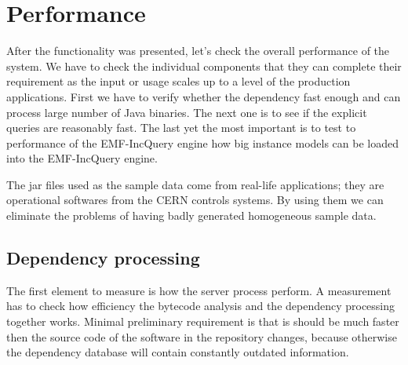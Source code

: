 \section{Performance}
After the functionality was presented, let's check the overall performance of
the system. We have to check the individual components  that they can complete
their requirement as the input or usage scales up to a level of the production
applications. First we have to verify whether the dependency fast enough and can
process large number of Java binaries. The next one is to see if the explicit
queries are reasonably fast. The last yet the most important is to test to
performance of the EMF-IncQuery engine how big instance models can be loaded
into the EMF-IncQuery engine.

The jar files used as the sample data come from real-life applications; they are
operational softwares from the CERN controls systems. By using them we can
eliminate the problems of having badly generated homogeneous sample data.

\subsection{Dependency processing}
The first element to measure is how the server process perform.
A measurement has to check how efficiency the bytecode analysis and the
dependency processing together works. Minimal preliminary requirement is that is
should be much faster then the source code of the software in  the repository
changes, because otherwise the dependency database will contain constantly
outdated information.

